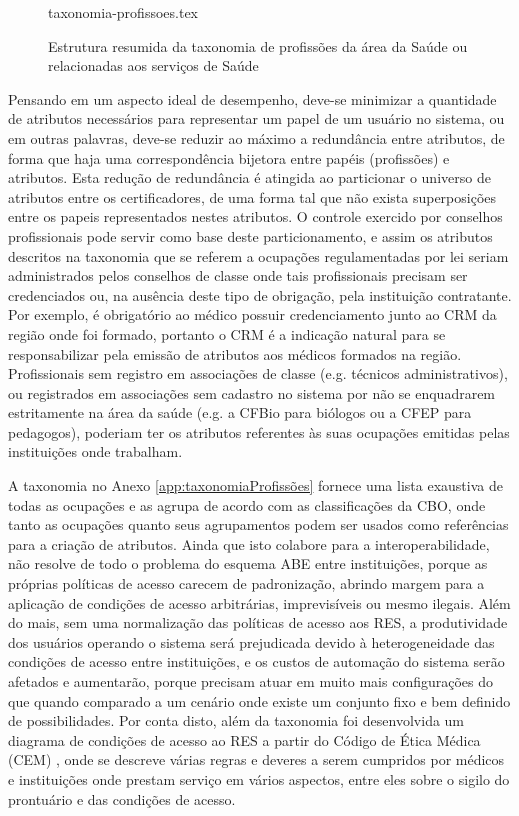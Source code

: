 \documentclass[a4paper,11pt]{article}
\begin{document}
\begin{figure}[h]
  \centering
  {taxonomia-profissoes.tex}
  \caption{Estrutura resumida da taxonomia de profissões da área da Saúde ou relacionadas aos serviços de Saúde}
  \label{fig:taxonomiaPermissoes}
\end{figure}

Pensando em um aspecto ideal de desempenho, deve-se minimizar a quantidade de atributos necessários para representar um papel de um usuário no sistema, ou em outras palavras, deve-se reduzir ao máximo a redundância entre atributos, de forma que haja uma correspondência bijetora entre papéis (profissões) e atributos.
Esta redução de redundância é atingida ao particionar o universo de atributos entre os certificadores, de uma forma tal que não exista superposições entre os papeis representados nestes atributos.
O controle exercido por conselhos profissionais pode servir como base deste particionamento, e assim os atributos descritos na taxonomia que se referem a ocupações regulamentadas por lei seriam administrados pelos conselhos de classe onde tais profissionais precisam ser credenciados ou, na ausência deste tipo de obrigação, pela instituição contratante.
Por exemplo, é obrigatório ao médico possuir credenciamento junto ao CRM da região onde foi formado, portanto o CRM é a indicação natural para se responsabilizar pela emissão de atributos aos médicos formados na região.
Profissionais sem registro em associações de classe (e.g. técnicos administrativos), ou registrados em associações sem cadastro no sistema por não se enquadrarem estritamente na área da saúde (e.g. a CFBio para biólogos ou a CFEP para pedagogos), poderiam ter os atributos referentes às suas ocupações emitidas pelas instituições onde trabalham.

A taxonomia no Anexo \ref{app:taxonomiaProfissões} fornece uma lista exaustiva de todas as ocupações e as agrupa de acordo com as classificações da CBO, onde tanto as ocupações quanto seus agrupamentos podem ser usados como referências para a criação de atributos.
Ainda que isto colabore para a interoperabilidade, não resolve de todo o problema do esquema ABE entre instituições, porque as próprias políticas de acesso carecem de padronização, abrindo margem para a aplicação de condições de acesso arbitrárias, imprevisíveis ou mesmo ilegais.
Além do mais, sem uma normalização das políticas de acesso aos RES, a produtividade dos usuários operando o sistema será prejudicada devido à heterogeneidade das condições de acesso entre instituições, e os custos de automação do sistema serão afetados e aumentarão, porque precisam atuar em muito mais configurações do que quando comparado a um cenário onde existe um conjunto fixo e bem definido de possibilidades.
Por conta disto, além da taxonomia foi desenvolvida um diagrama de condições de acesso ao RES a partir do Código de Ética Médica (CEM) \cite{ConselhoFederaldeMedicina2019}, onde se descreve várias regras e deveres a serem cumpridos por médicos e instituições onde prestam serviço em vários aspectos, entre eles sobre o sigilo do prontuário e das condições de acesso.
\end{document}
